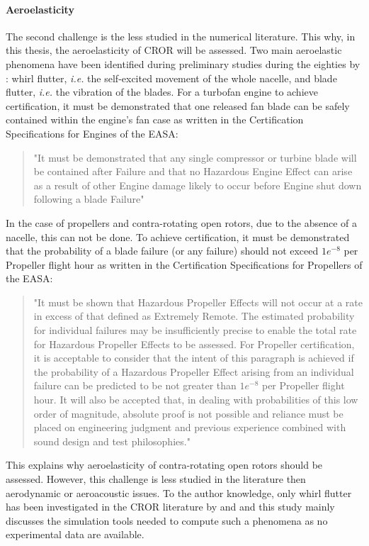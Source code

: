 \paragraph{Aeroelasticity}
The second challenge is the less studied in the numerical literature.
This why, in this thesis, the aeroelasticity of CROR will be assessed.
Two main aeroelastic phenomena have been identified during preliminary studies
during the eighties by \citet{Hager1988}: whirl flutter, \emph{i.e.} the self-excited
movement of the whole nacelle, and blade flutter, \emph{i.e.} the vibration
of the blades.
For a turbofan engine to achieve certification, it must be demonstrated that one released fan blade can be safely contained within the engine’s fan case as written in the 
Certification Specifications for Engines of the EASA:
\begin{quote}
	"It must be demonstrated that any single compressor or turbine blade will be contained after Failure and 
that no Hazardous Engine Effect can arise as a result of other Engine damage likely to occur before 
Engine shut down following a blade Failure"
\end{quote}
In the case of propellers and contra-rotating open rotors, due to the absence of a nacelle,
this can not be done. To achieve certification, it must be demonstrated that the probability of a blade
failure (or any failure) should not exceed $1e^{-8}$ per Propeller flight hour as written in 
the Certification Specifications for Propellers of the EASA:
\begin{quote}
	"It must be shown that Hazardous Propeller Effects will not occur at a rate in excess of that defined 
as Extremely Remote. The estimated probability for individual failures may be insufficiently precise 
to enable the total rate for Hazardous Propeller Effects to be assessed. For Propeller certification, it 
is acceptable to consider that the intent of this paragraph is achieved if the probability of a 
Hazardous Propeller Effect arising from an individual failure can be predicted to be not greater than 
$1e^{-8}$ per Propeller flight hour. It will also be accepted that, in dealing with probabilities of this low 
order of magnitude, absolute proof is not possible and reliance must be placed on engineering 
judgment and previous experience combined with sound design and test philosophies." 
\end{quote}
This explains why aeroelasticity of contra-rotating open rotors should be assessed.
However, this challenge is less studied in the literature then aerodynamic or aeroacoustic
issues.
To the author knowledge, only whirl flutter has been investigated
in the CROR literature by \citet{CISicot2011a} and \citet{Verley2013} and this study mainly
discusses the simulation tools needed to compute such a phenomena as
no experimental data are available.
